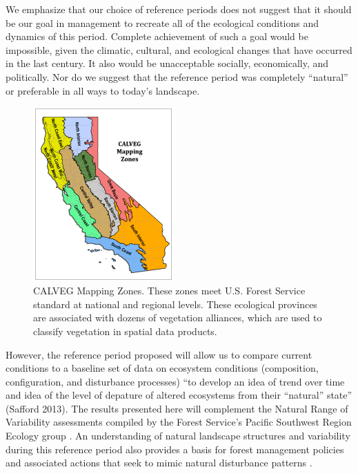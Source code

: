 We emphasize that our choice of reference periods does not suggest that it should be our goal in management to recreate all of the ecological conditions and dynamics of this period. Complete achievement of such a goal would be impossible, given the climatic, cultural, and ecological changes that have occurred in the last century. It also would be unacceptable socially, economically, and politically. Nor do we suggest that the reference period was completely ``natural'' or preferable in all ways to today’s landscape. 

\begin{figure}
\includegraphics[width=0.48\textwidth]{images/CALVEGmappingzones.png}
\caption{\small CALVEG Mapping Zones. These zones meet U.S. Forest Service standard at national and regional levels. These ecological provinces are associated with dozens of vegetation alliances, which are used to classify vegetation in spatial data products.} 
\label{calveg}
\end{figure}

However, the reference period proposed will allow us to compare current conditions to a baseline set of data on ecosystem conditions (composition, configuration, and disturbance processes) ``to develop an idea of trend over time and idea of the level of depature of altered ecosystems from their ``natural'' state'' (Safford 2013). The results presented here will complement the Natural Range of Variability assessments compiled by the Forest Service's Pacific Southwest Region Ecology group \citep[e.g.,][]{Safford2013,Merriam2013,Meyer2013a,Meyer2013,Estes2013,Estes2013a,Gross2013}. An understanding of natural landscape structures and variability during this reference period also provides a basis for forest management policies and associated actions that seek to mimic natural disturbance patterns \cite{Romme2000,Buse2002}.

